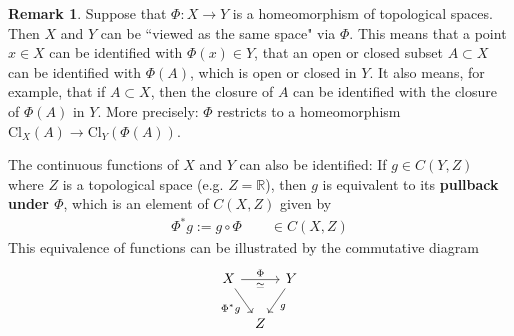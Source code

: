 \documentclass[12pt,b5paper,notitlepage]{article}
\theoremstyle{definition}
\newtheorem{rem}[df]{Remark}
\theoremstyle{plain}
\newcommand{\Rbb}{\mathbb R}
\newcommand{\Cl}{\mathrm{Cl}}
\numberwithin{equation}{section}
\begin{document}
\begin{rem}\label{lb472}
Suppose that $\Phi:X\rightarrow Y$ is a homeomorphism of topological spaces. Then $X$ and $Y$ can be ``viewed as the same space" via $\Phi$. This means that a point $x\in X$ can be identified with $\Phi(x)\in Y$, that an open or closed subset $A\subset X$ can be identified with $\Phi(A)$, which is open or closed in $Y$. It also means, for example, that if $A\subset X$, then the closure of $A$ can be identified with the closure of $\Phi(A)$ in $Y$. More precisely: $\Phi$ restricts to a homeomorphism $\Cl_X(A)\rightarrow\Cl_Y(\Phi(A))$.

The continuous functions of $X$ and $Y$ can also be identified: If $g\in C(Y,Z)$ where $Z$ is a topological space (e.g. $Z=\Rbb$), then $g$ is equivalent to its \textbf{pullback under $\Phi$},  which is an element of $C(X,Z)$ given by
\begin{align}
\Phi^*g:=g\circ\Phi\qquad\in C(X,Z)
\end{align}
This equivalence of functions can be illustrated by the commutative diagram
\begin{equation}
\begin{tikzcd}[column sep=tiny]
X \arrow[rr, "\Phi","\simeq"'] \arrow[rd, "\Phi^*g"'] &   & Y \arrow[ld, "g"] \\
                                            & Z &                  
\end{tikzcd}
\end{equation}
\hfill\qedsymbol
\end{rem}
\end{document}
